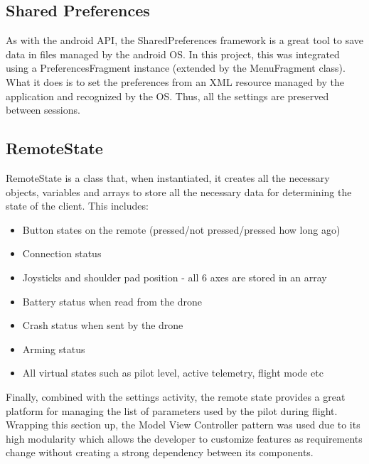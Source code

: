 \documentclass{IEEEtran}
\begin{document}
\subsection*{Shared Preferences}
\noindent As with the android API, the SharedPreferences framework is a great tool to save data in files managed by the android OS. In this project, this was integrated using a PreferencesFragment instance (extended by the MenuFragment class). What it does is to set the preferences from an XML resource managed by the application and recognized by the OS. Thus, all the settings are preserved between sessions.

\subsection*{RemoteState}
\noindent RemoteState is a class that, when instantiated, it creates all the necessary objects, variables and arrays to store all the necessary data for determining the state of the client. This includes:
\begin{itemize}
    \item Button states on the remote (pressed/not pressed/pressed how long ago)
    \item Connection status
    \item Joysticks and shoulder pad position - all 6 axes are stored in an array
    \item Battery status when read from the drone
    \item Crash status when sent by the drone
    \item Arming status
    \item All virtual states such as pilot level, active telemetry, flight mode etc
\end{itemize}
Finally, combined with the settings activity, the remote state provides a great platform for managing the list of parameters used by the pilot during flight. 
\newline
\newline
Wrapping this section up, the Model View Controller pattern was used due to its high modularity which allows the developer to customize features as requirements change without creating a strong dependency between its components.

\clearpage
\pagebreak
\end{document}
